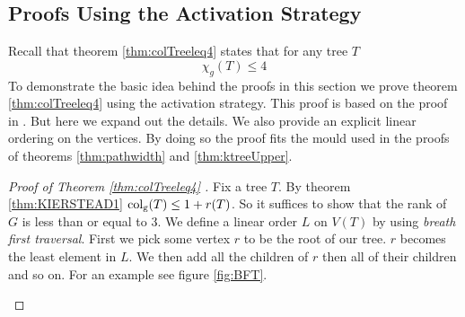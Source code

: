 \subsection{Proofs Using the Activation Strategy} \label{sec:actvStratProofs}
Recall that theorem \ref{thm:colTreeleq4} states that for any tree $T$ \[\chi_g(T)\leq 4\]
To demonstrate the basic idea behind the proofs in this section we prove theorem \ref{thm:colTreeleq4} using the activation strategy. This proof is based on the proof in \cite{KIERSTEAD2000}. But here we expand out the details. We also provide an explicit linear ordering on the vertices. By doing so the proof fits the mould used in the proofs of theorems \ref{thm:pathwidth} and \ref{thm:ktreeUpper}. 

\begin{proof}[Proof of Theorem \ref{thm:colTreeleq4} \cite{KIERSTEAD2000}]
    Fix a tree $T$. By theorem \ref{thm:KIERSTEAD1} $\operatorname{col_g}(T)\leq1 + r(T)$. So it suffices to show that the rank of $G$ is less than or equal to 3. We define a linear order $L$ on $V(T)$ by using \textit{breath first traversal}. First we pick some vertex $r$ to be the root of our tree. $r$ becomes the least element in $L$. We then add all the children of $r$ then all of their children and so on. For an example see figure \ref{fig:BFT}.  
    \begin{figure}[h]
        \centering
\end{figure}
\end{proof}
